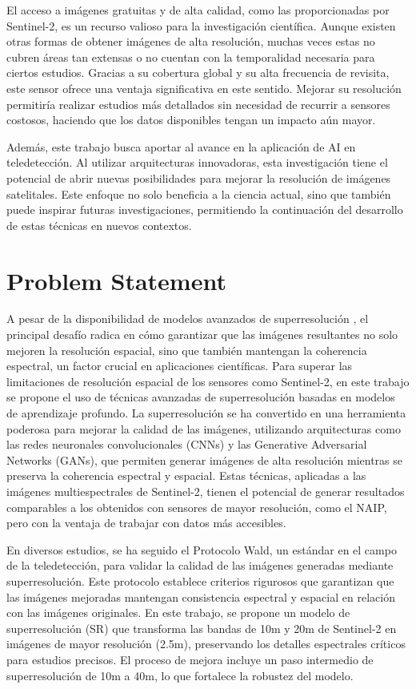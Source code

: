 El acceso a imágenes gratuitas y de alta calidad, como las proporcionadas por Sentinel-2, es un recurso valioso para la investigación científica. Aunque existen otras formas de obtener imágenes de alta resolución, muchas veces estas no cubren áreas tan extensas o no cuentan con la temporalidad necesaria para ciertos estudios. Gracias a su cobertura global y su alta frecuencia de revisita, este sensor ofrece una ventaja significativa en este sentido. Mejorar su resolución permitiría realizar estudios más detallados sin necesidad de recurrir a sensores costosos, haciendo que los datos disponibles tengan un impacto aún mayor.

Además, este trabajo busca aportar al avance en la aplicación de AI en teledetección. Al utilizar arquitecturas innovadoras, esta investigación tiene el potencial de abrir nuevas posibilidades para mejorar la resolución de imágenes satelitales. Este enfoque no solo beneficia a la ciencia actual, sino que también puede inspirar futuras investigaciones, permitiendo la continuación del desarrollo de estas técnicas en nuevos contextos.


\section{Problem Statement}


A pesar de la disponibilidad de modelos avanzados de superresolución \autocite{salgueiro2020super, navarro_sánchez_2020}, el principal desafío radica en cómo garantizar que las imágenes resultantes no solo mejoren la resolución espacial, sino que también mantengan la coherencia espectral, un factor crucial en aplicaciones científicas. Para superar las limitaciones de resolución espacial de los sensores como Sentinel-2, en este trabajo se propone el uso de técnicas avanzadas de superresolución basadas en modelos de aprendizaje profundo. La superresolución se ha convertido en una herramienta poderosa para mejorar la calidad de las imágenes, utilizando arquitecturas como las redes neuronales convolucionales (CNNs) y las Generative Adversarial Networks (GANs), que permiten generar imágenes de alta resolución mientras se preserva la coherencia espectral y espacial. Estas técnicas, aplicadas a las imágenes multiespectrales de Sentinel-2, tienen el potencial de generar resultados comparables a los obtenidos con sensores de mayor resolución, como el NAIP, pero con la ventaja de trabajar con datos más accesibles.

En diversos estudios, se ha seguido el Protocolo Wald, un estándar en el campo de la teledetección, para validar la calidad de las imágenes generadas mediante superresolución. Este protocolo establece criterios rigurosos que garantizan que las imágenes mejoradas mantengan consistencia espectral y espacial en relación con las imágenes originales. En este trabajo, se propone un modelo de superresolución (SR) que transforma las bandas de 10m y 20m de Sentinel-2 en imágenes de mayor resolución (2.5m), preservando los detalles espectrales críticos para estudios precisos. El proceso de mejora incluye un paso intermedio de superresolución de 10m a 40m, lo que fortalece la robustez del modelo.

